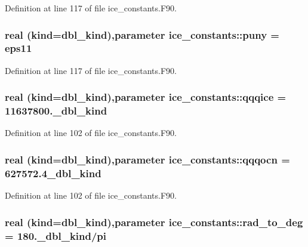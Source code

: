 Definition at line 117 of file ice\_\-constants.F90.\hypertarget{namespaceice__constants_af5d2a72e22e7a53706b6a41ba932a67d}{
\subsubsection[{puny}]{\setlength{\rightskip}{0pt plus 5cm}real (kind=dbl\_\-kind),parameter {\bf ice\_\-constants::puny} = {\bf eps11}}}
\label{namespaceice__constants_af5d2a72e22e7a53706b6a41ba932a67d}


Definition at line 117 of file ice\_\-constants.F90.\hypertarget{namespaceice__constants_a99597a5a1a0a2eb223e155e209b95538}{
\subsubsection[{qqqice}]{\setlength{\rightskip}{0pt plus 5cm}real (kind=dbl\_\-kind),parameter {\bf ice\_\-constants::qqqice} = 11637800.\_\-dbl\_\-kind}}
\label{namespaceice__constants_a99597a5a1a0a2eb223e155e209b95538}


Definition at line 102 of file ice\_\-constants.F90.\hypertarget{namespaceice__constants_a6768cc2f1ba89cd471ab5fd955e839c1}{
\subsubsection[{qqqocn}]{\setlength{\rightskip}{0pt plus 5cm}real (kind=dbl\_\-kind),parameter {\bf ice\_\-constants::qqqocn} = 627572.4\_\-dbl\_\-kind}}
\label{namespaceice__constants_a6768cc2f1ba89cd471ab5fd955e839c1}


Definition at line 102 of file ice\_\-constants.F90.\hypertarget{namespaceice__constants_a499282766889f13defe6ffd6c7aa1216}{
\subsubsection[{rad\_\-to\_\-deg}]{\setlength{\rightskip}{0pt plus 5cm}real (kind=dbl\_\-kind),parameter {\bf ice\_\-constants::rad\_\-to\_\-deg} = 180.\_\-dbl\_\-kind/{\bf pi}}}
\label{namespaceice__constants_a499282766889f13defe6ffd6c7aa1216}


